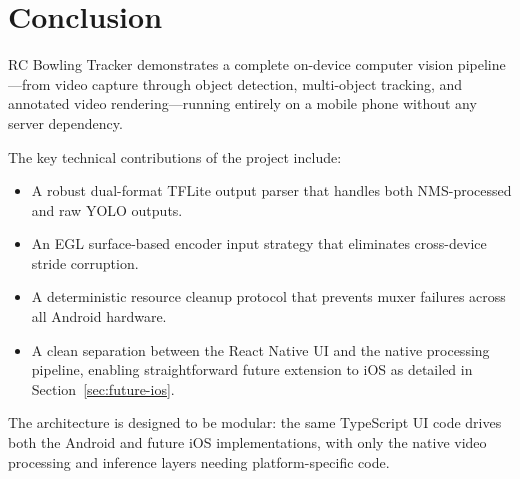 \documentclass{zc-ust-hw}
\begin{document}
\section{Conclusion}

RC Bowling Tracker demonstrates a complete on-device computer vision pipeline—from video capture through object detection, multi-object tracking, and annotated video rendering—running entirely on a mobile phone without any server dependency.

The key technical contributions of the project include:
\begin{itemize}
    \item A robust dual-format TFLite output parser that handles both NMS-processed and raw YOLO outputs.
    \item An EGL surface-based encoder input strategy that eliminates cross-device stride corruption.
    \item A deterministic resource cleanup protocol that prevents muxer failures across all Android hardware.
    \item A clean separation between the React Native UI and the native processing pipeline, enabling straightforward future extension to iOS as detailed in Section~\ref{sec:future-ios}.
\end{itemize}

The architecture is designed to be modular: the same TypeScript UI code drives both the Android and future iOS implementations, with only the native video processing and inference layers needing platform-specific code.
\end{document}
